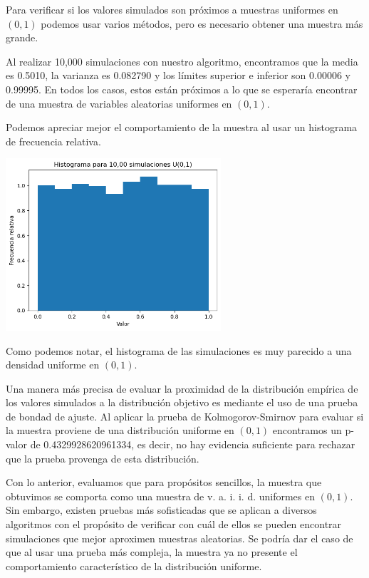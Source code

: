 \documentclass{article}
\begin{document}
\begin{enumerate}
    Para verificar si los valores simulados son próximos a muestras uniformes en $(0,1)$
    podemos usar varios métodos, pero es necesario obtener una muestra más grande.

    Al realizar 10,000 simulaciones con nuestro algoritmo, encontramos que la media es 0.5010,
    la varianza es 0.082790 y los límites superior e inferior son 0.00006 y 0.99995. En todos 
    los casos, estos están próximos a lo que se esperaría encontrar de una muestra de variables
    aleatorias uniformes en $(0,1)$. 

    Podemos apreciar mejor el comportamiento de la muestra al usar un histograma de frecuencia
    relativa.

    \begin{center}
        \includegraphics[width=0.6\textwidth]{hist_unif.png}
    \end{center}

    Como podemos notar, el histograma de las simulaciones es muy parecido a una densidad uniforme
    en $(0,1)$. 
    
    Una manera más precisa de evaluar la proximidad de la distribución empírica
    de los valores simulados a la distribución objetivo es mediante el uso de una prueba de bondad 
    de ajuste. Al aplicar la prueba de Kolmogorov-Smirnov para evaluar si la muestra proviene de
    una distribución uniforme en $(0,1)$ encontramos un p-valor de 0.4329928620961334, es decir,
    no hay evidencia suficiente para rechazar que la prueba provenga de esta distribución.

    Con lo anterior, evaluamos que para propósitos sencillos, la muestra que obtuvimos se comporta
    como una muestra de v. a. i. i. d. uniformes en $(0,1)$. Sin embargo, existen pruebas más sofisticadas
    que se aplican a diversos algoritmos con el propósito de verificar con cuál de ellos se pueden
    encontrar simulaciones que mejor aproximen muestras aleatorias. Se podría dar el caso de que al
    usar una prueba más compleja, la muestra ya no presente el comportamiento característico de 
    la distribución uniforme.



\end{enumerate}
\end{document}
